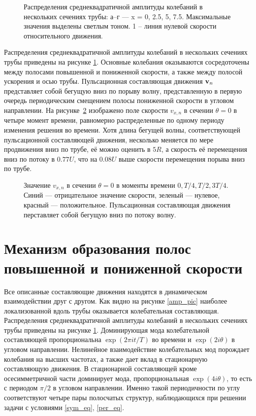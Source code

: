 \begin{figure}[h]
\caption{Распределения среднеквадратичной амплитуды колебаний в нескольких сечениях трубы: а--г --- x = 0, 2.5, 5, 7.5. Максимальные значения выделены светлым
тоном. 1 – линия нулевой скорости относительного движения.}
\label{puls_cs_pic}
\end{figure}


Распределения среднеквадратичной амплитуды колебаний в нескольких сечениях трубы приведены на рисунке \ref{puls_cs_pic}. Основные колебания оказываются сосредоточены между полосами повышенной и пониженной скорости, а также между полосой ускорения и осью трубы. Пульсационная составляющая движения $\mathbf{v}_n$ представляет собой бегущую вниз по порыву волну, представленную в первую очередь периодическим смещением полосы пониженной скорости в угловом направлении. На рисунке~\ref{puls_ls_pic} изображено поле скорости $v_{x,n}$ в сечении $\theta = 0$ в четыре момент времени, равномерно распределенные по одному периоду изменения решения во времени. Хотя длина бегущей волны, соответствующей пульсационной составляющей движения, несколько меняется по мере продвижения вниз по трубе, её можно оценить в $5R$, а скорость её перемещения вниз по потоку в $0.77U$, что на $0.08U$ выше скорости перемещения порыва вниз по трубе.  


\begin{figure}[h]
\caption{Значение $v_{x,n}$ в сечении $\theta=0$ в моменты времени $0, T/4, T/2, 3T/4$. Синий --- отрицательное значение скорости, зеленый --- нулевое, красный --- положительное. Пульсационная составляющая движения перставляет собой бегущую вниз по потоку волну. }
\label{puls_ls_pic}
\end{figure}


\section{Механизм образования полос повышенной и пониженной скорости} 

Все описанные составляющие движения находятся в динамическом взаимодействии друг с другом. Как видно на рисунке \ref{amp_pic} наиболее локализованной вдоль трубы оказывается колебательная составляющая. Распределения среднеквадратичной амплитуды колебаний в нескольких сечениях трубы приведены на рисунке \ref{puls_cs_pic}.  Доминирующая мода колебательной составляющей пропорциональна $\exp(2\pi it/T)$ во времени и $\exp(2i\theta)$ в угловом направлении. Нелинейное взаимодействие колебательных мод порождает колебания на высших частотах, а также дает вклад в стационарную составляющую движения. В стационарной составляющей кроме осесимметричной части доминирует мода, пропорциональная $\exp(4i\theta)$, то есть с периодом $\pi/2$ в угловом направлении. Именно такой периодичности по углу соответствуют четыре пары полосчатых структур, наблюдающихся при решении задачи с условиями \eqref{sym_eq}, \eqref{per_eq}.

